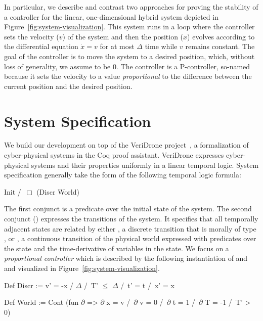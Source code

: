 \documentclass[preprint,nocopyrightspace]{sigplanconf}
\begin{document}

In particular, we describe and contrast two approaches for proving the stability of a controller for the linear, one-dimensional hybrid system depicted in Figure~\ref{fig:system-visualization}.
This system runs in a loop where the controller sets the velocity ($v$) of the system and then the position ($x$) evolves according to the differential equation $\dot{x} = v$ for at most $\Delta$ time while $v$ remains constant.
The goal of the controller is to move the system to a desired position, which, without loss of generality, we assume to be 0.
The controller is a P-controller, so-named because it sets the velocity to a value \emph{proportional} to the difference between the current position and the desired position.

\section{System Specification}
\label{sec:veridrone}

We build our development on top of the VeriDrone project~\cite{ricketts2015veridrone}, a formalization of cyber-physical systems in the Coq proof assistant.
VeriDrone expresses cyber-physical systems and their properties uniformly in a linear temporal logic.
System specification generally take the form of the following temporal logic formula:
\begin{coq}
Init /\ $\Box$ (Discr \/ World)
\end{coq}
The first conjunct  is a predicate over the initial state of the system.
The second conjunct () expresses the transitions of the system.
It specifies that all temporally adjacent states are related by either , a discrete transition that is morally of type , or , a continuous transition of the physical world expressed with predicates over the state and the time-derivative of variables in the state.
We focus on a \emph{proportional controller} which is described by the following instantiation of  and  and visualized in Figure~\ref{fig:system-visualization}. %
\begin{coq}
Def Discr := v' = -x / $\Delta$ /\ T' $\leq$ $\Delta$ /\ t' = t /\ x' = x

Def World :=
 Cont (fun $\partial$ => $\partial$ x = v /\ $\partial$ v = 0 /\ $\partial$ t = 1 /\ $\partial$ T = -1 /\ T' > 0)
\end{coq}
\end{document}
